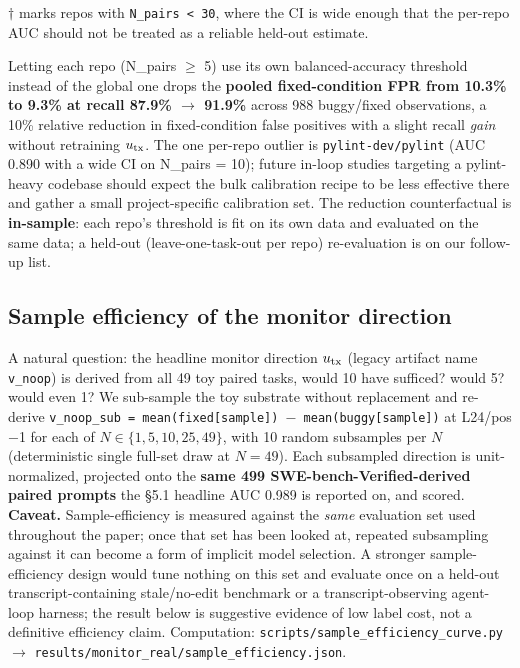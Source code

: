 \documentclass[
  11pt,
  a4paper]{article}
\begin{document}
\ensuremath{\dagger} marks repos with \texttt{N\_pairs\ \textless{}\ 30}, where the CI is
wide enough that the per-repo AUC should not be treated as a reliable
held-out estimate.

Letting each repo (N\_pairs \ensuremath{\geq} 5) use its own balanced-accuracy threshold
instead of the global one drops the \textbf{pooled fixed-condition FPR
from 10.3\% to 9.3\% at recall 87.9\% \ensuremath{\rightarrow} 91.9\%} across 988 buggy/fixed
observations, a 10\% relative reduction in fixed-condition false
positives with a slight recall \emph{gain} without retraining
\(u_{\rm tx}\). The one per-repo outlier is \texttt{pylint-dev/pylint}
(AUC 0.890 with a wide CI on N\_pairs = 10); future in-loop studies
targeting a pylint-heavy codebase should expect the bulk calibration
recipe to be less effective there and gather a small project-specific
calibration set. The reduction counterfactual is \textbf{in-sample}:
each repo's threshold is fit on its own data and evaluated on the same
data; a held-out (leave-one-task-out per repo) re-evaluation is on our
follow-up list.

\subsection{Sample efficiency of the monitor
direction}\label{sample-efficiency-of-the-monitor-direction}

A natural question: the headline monitor direction \(u_{\rm tx}\)
(legacy artifact name \texttt{v\_noop}) is derived from all 49 toy
paired tasks, would 10 have sufficed? would 5? would even 1? We
sub-sample the toy substrate without replacement and re-derive
\texttt{v\_noop\_sub\ =\ mean(fixed{[}sample{]})\ \ensuremath{-}\ mean(buggy{[}sample{]})}
at L24/pos \ensuremath{-}1 for each of \(N \in \{1, 5, 10, 25, 49\}\), with 10 random
subsamples per \(N\) (deterministic single full-set draw at \(N=49\)).
Each subsampled direction is unit-normalized, projected onto the
\textbf{same 499 SWE-bench-Verified-derived paired prompts} the \S{}5.1
headline AUC 0.989 is reported on, and scored. \textbf{Caveat.}
Sample-efficiency is measured against the \emph{same} evaluation set
used throughout the paper; once that set has been looked at, repeated
subsampling against it can become a form of implicit model selection. A
stronger sample-efficiency design would tune nothing on this set and
evaluate once on a held-out transcript-containing stale/no-edit
benchmark or a transcript-observing agent-loop harness; the result below
is suggestive evidence of low label cost, not a definitive efficiency
claim. Computation: \texttt{scripts/sample\_efficiency\_curve.py} \ensuremath{\rightarrow}
\texttt{results/monitor\_real/sample\_efficiency.json}.
\end{document}
